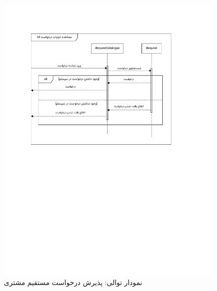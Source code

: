 \begin{figure}[ht!]
	\centering
	\includegraphics[scale=0.8, page=3]{figs/OOD-Sequence-2.pdf}
	\caption{نمودار توالی: پذیرش درخواست مستقیم مشتری}
\end{figure}
\FloatBarrier
\newpage

